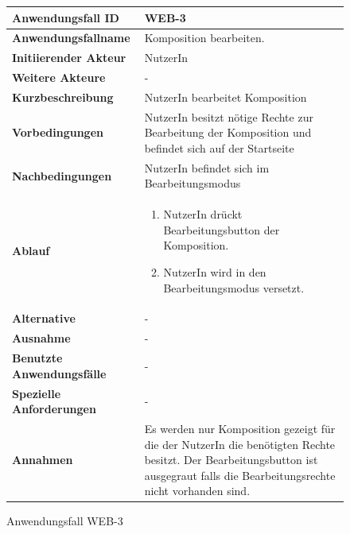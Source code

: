\begin{figure}[h]
	\centering
	\begin{tabularx}{\textwidth}{ X | X }
		\textbf{Anwendungsfall ID} & WEB-3 \\ \hline
		\textbf{Anwendungsfallname} & Komposition bearbeiten. \\ \hline
		\textbf{Initiierender Akteur} & NutzerIn \\ \hline
		\textbf{Weitere Akteure} & - \\ \hline
		\textbf{Kurzbeschreibung} & NutzerIn bearbeitet Komposition \\ \hline
		\textbf{Vorbedingungen} & NutzerIn besitzt nötige Rechte zur Bearbeitung der Komposition und befindet sich auf der Startseite \\ \hline
		\textbf{Nachbedingungen} & NutzerIn befindet sich im Bearbeitungsmodus \\ \hline
		\textbf{Ablauf} &
		\begin{enumerate}
			\item  NutzerIn drückt Bearbeitungsbutton der Komposition.
			\item  NutzerIn wird in den Bearbeitungsmodus versetzt.
		\end{enumerate} \\ \hline
		\textbf{Alternative} & - \\ \hline
		\textbf{Ausnahme} & - \\ \hline
		\textbf{Benutzte Anwendungsfälle} & - \\ \hline
		\textbf{Spezielle Anforderungen} & - \\ \hline
		\textbf{Annahmen} & Es werden nur Komposition gezeigt für die der NutzerIn die benötigten Rechte besitzt.
                  Der Bearbeitungsbutton ist ausgegraut falls die Bearbeitungsrechte nicht vorhanden sind.
	\end{tabularx}
	\caption{Anwendungsfall WEB-3}
	\label{fig:anwendungsfall-server-tabelle-web-3}
\end{figure}

